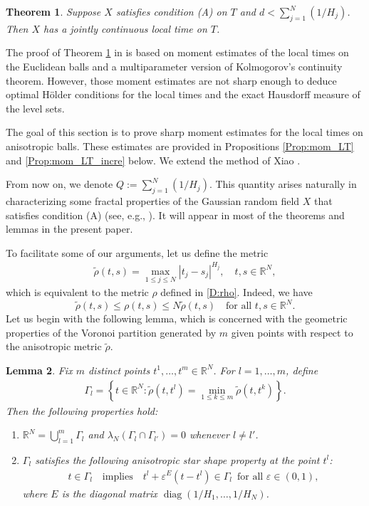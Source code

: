 \documentclass[11pt, reqno]{amsart}
\newtheorem{theorem}{Theorem}[section]
\newtheorem{lemma}[theorem]{Lemma}
\def\R{{\mathbb R}}
\numberwithin{equation}{section}
\begin{document}
\begin{theorem}\label{Th:joint_cont_LT}
Suppose $X$ satisfies condition \textup{(A)} on $T$ and $d < \sum_{j=1}^N (1/H_j)$. Then $X$ has a jointly 
continuous local time on $T$.
\end{theorem}

The proof of Theorem \ref{Th:joint_cont_LT} in \cite{X09} is based on moment estimates of the local times on the 
Euclidean balls and a multiparameter version of Kolmogorov's continuity theorem. However, those moment estimates 
are not sharp enough to deduce optimal H\"older conditions for the local times and the exact Hausdorff measure of the 
level sets.

The goal of this section is to prove sharp moment estimates for the local times on anisotropic balls. 
These estimates are provided in Propositions \ref{Prop:mom_LT} and \ref{Prop:mom_LT_incre} below.
We extend the method of Xiao \cite[Lemma 2.5]{X97}. 

From now on, we denote $Q :=  \sum_{j=1}^N (1/H_j)$. This quantity arises naturally in characterizing some fractal 
properties of the Gaussian random field $X$ that satisfies condition \textup{(A)} (see, e.g., \cite{X09}). It will appear in 
most of the theorems and lemmas in the present paper. 

To facilitate some of our arguments, let us define the metric
\begin{align}\label{D:rho_tilde}
\tilde{\rho}(t, s) = \max_{1 \le j \le N} |t_j - s_j|^{H_j}, \quad t, s \in \R^N,
\end{align}
which is equivalent to the metric $\rho$ defined in \eqref{D:rho}.
Indeed, we have
\begin{equation}\label{Eq:equiv_metric}
\tilde{\rho}(t,s) \le \rho(t, s) \le N \tilde{\rho}(t, s) \quad \text{for all } t, s \in \R^N.
\end{equation}
Let us begin with the following lemma, which is concerned with the geometric properties of the Voronoi partition 
generated by $m$ given points with respect to the anisotropic metric $\tilde\rho$.

\begin{lemma}\label{lem:Gamma}
Fix $m$ distinct points $t^1, \dots, t^m \in \R^N$.
For $l = 1, \dots, m$, define
\begin{align}\label{D:Gamma}
\Gamma_l = \left\{ t \in \R^N : \tilde\rho(t, t^l) = \min_{1 \le k \le m} \tilde\rho(t, t^k) \right\}.
\end{align}
Then the following properties hold:
\begin{enumerate}
\item[(i)] $\R^N = \bigcup_{l=1}^m \Gamma_l$ and $\lambda_N(\Gamma_l \cap \Gamma_{l'}) = 0$ whenever $l \ne l'$.
\item[(ii)] $\Gamma_l$ satisfies the following anisotropic star shape property at the point $t^l$:
\begin{align}\label{E:star}
t \in \Gamma_l \quad \text{implies} \quad t^l + \varepsilon^E (t-t^l) \in \Gamma_l\, \text{ for all }\varepsilon \in (0, 1),
\end{align}
where $E$ is the diagonal matrix $\operatorname{diag}(1/H_1, \dots, 1/H_N)$.
\end{enumerate}
\end{lemma}
\end{document}
